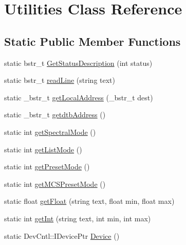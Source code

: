 \hypertarget{class_utilities}{}\section{Utilities Class Reference}
\label{class_utilities}
\subsection*{Static Public Member Functions}
\begin{DoxyCompactItemize}
\item 
static bstr\+\_\+t \hyperlink{class_utilities_a513806325f04d3f14657656d391fd581_a513806325f04d3f14657656d391fd581}{Get\+Status\+Description} (int status)
\item 
static bstr\+\_\+t \hyperlink{class_utilities_ac2d9ddd205aa23ab4239fe8761a16283_ac2d9ddd205aa23ab4239fe8761a16283}{read\+Line} (string text)
\item 
static \+\_\+bstr\+\_\+t \hyperlink{class_utilities_a02ce22f897bab42c413bbfb90c2022a2_a02ce22f897bab42c413bbfb90c2022a2}{get\+Local\+Address} (\+\_\+bstr\+\_\+t dest)
\item 
static \+\_\+bstr\+\_\+t \hyperlink{class_utilities_aeb41a986f419ffd74a7a499562c19e09_aeb41a986f419ffd74a7a499562c19e09}{getdtb\+Address} ()
\item 
static int \hyperlink{class_utilities_a9cf757f567c9521f6d9867e36db3390a_a9cf757f567c9521f6d9867e36db3390a}{get\+Spectral\+Mode} ()
\item 
static int \hyperlink{class_utilities_a399c7018566d21e1f0f6c0b9698e0169_a399c7018566d21e1f0f6c0b9698e0169}{get\+List\+Mode} ()
\item 
static int \hyperlink{class_utilities_a13331eb352ca5cce3fc25a5af99ea87c_a13331eb352ca5cce3fc25a5af99ea87c}{get\+Preset\+Mode} ()
\item 
static int \hyperlink{class_utilities_aa928f0fb9ad8737b44c5878a37b39be6_aa928f0fb9ad8737b44c5878a37b39be6}{get\+M\+C\+S\+Preset\+Mode} ()
\item 
static float \hyperlink{class_utilities_a7c3601cdf332005fbf77b4d1676945ec_a7c3601cdf332005fbf77b4d1676945ec}{get\+Float} (string text, float min, float max)
\item 
static int \hyperlink{class_utilities_a9f5959c51661e1ec06438d787ffe243a_a9f5959c51661e1ec06438d787ffe243a}{get\+Int} (string text, int min, int max)
\item 
static Dev\+Cntl\+::\+I\+Device\+Ptr \hyperlink{class_utilities_aebdda516a1576b1ad42b841d5eac817c_aebdda516a1576b1ad42b841d5eac817c}{Device} ()

\end{DoxyCompactItemize}
